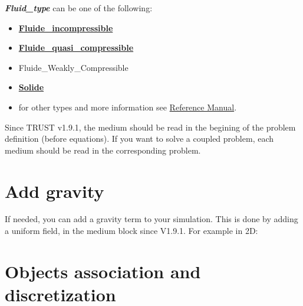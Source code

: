 {\bf{\textit{Fluid\_type}}} can be one of the following:
\begin{itemize}
\item \href{\REFERENCEMANUAL\#fluideincompressible}{\textbf{Fluide\_incompressible}}
\item \href{\REFERENCEMANUAL\#fluidequasicompressible}{\textbf{Fluide\_quasi\_compressible}}
\item Fluide\_Weakly\_Compressible
\item \href{\REFERENCEMANUAL\#solide}{\textbf{Solide}}
\item for other types and more information see \href{\REFERENCEMANUAL\#milieubase}{\trustref Reference Manual}.
\end{itemize}

Since TRUST v1.9.1, the medium should be read in the begining of the problem definition (before equations). If you want to solve a coupled problem, each medium should be read in the corresponding problem.\\





\section{Add gravity}
If needed, you can add a gravity term to your simulation. This is done by adding
a uniform field, in the medium block since V1.9.1. For example in 2D:

    \begin{center}
    \end{center}




\section{Objects association and discretization}
